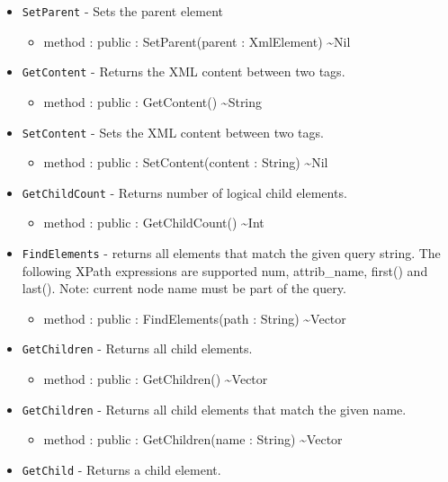 \documentclass[11pt]{article}
\begin{document}
\begin{itemize}
\begin{itemize}
  \end{itemize}
\item \texttt{SetParent} - Sets the parent element
  \begin{itemize}
  \item method : public : SetParent(parent : XmlElement) \textasciitilde Nil
  \end{itemize}
\item \texttt{GetContent} - Returns the XML content between two tags.
  \begin{itemize}
  \item method : public : GetContent() \textasciitilde String
  \end{itemize}
\item \texttt{SetContent} - Sets the XML content between two tags.
  \begin{itemize}
  \item method : public : SetContent(content : String) \textasciitilde Nil
  \end{itemize}
\item \texttt{GetChildCount} - Returns number of logical child
  elements.
  \begin{itemize}
  \item method : public : GetChildCount() \textasciitilde Int
  \end{itemize}
\item \texttt{FindElements} - returns all elements that match the
  given query string.  The following XPath expressions are supported
  num, attrib\_name, first() and last().  Note: current node name
  must be part of the query.
  \begin{itemize}
  \item method : public : FindElements(path : String) \textasciitilde Vector
  \end{itemize}
\item \texttt{GetChildren} - Returns all child elements.
  \begin{itemize}
  \item method : public : GetChildren() \textasciitilde Vector
  \end{itemize}
\item \texttt{GetChildren} - Returns all child elements that match the
  given name.
  \begin{itemize}
  \item method : public : GetChildren(name : String) \textasciitilde Vector
  \end{itemize}
\item \texttt{GetChild} - Returns a child element.

\end{itemize}
\end{document}
